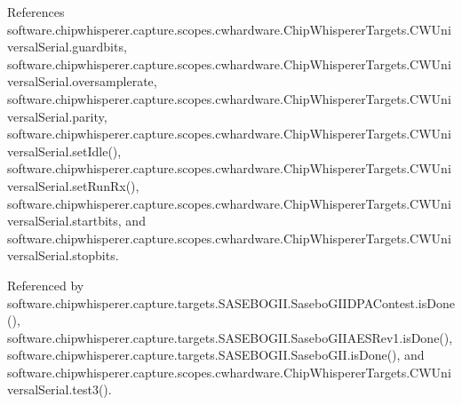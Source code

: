 References software.\+chipwhisperer.\+capture.\+scopes.\+cwhardware.\+Chip\+Whisperer\+Targets.\+C\+W\+Universal\+Serial.\+guardbits, software.\+chipwhisperer.\+capture.\+scopes.\+cwhardware.\+Chip\+Whisperer\+Targets.\+C\+W\+Universal\+Serial.\+oversamplerate, software.\+chipwhisperer.\+capture.\+scopes.\+cwhardware.\+Chip\+Whisperer\+Targets.\+C\+W\+Universal\+Serial.\+parity, software.\+chipwhisperer.\+capture.\+scopes.\+cwhardware.\+Chip\+Whisperer\+Targets.\+C\+W\+Universal\+Serial.\+set\+Idle(), software.\+chipwhisperer.\+capture.\+scopes.\+cwhardware.\+Chip\+Whisperer\+Targets.\+C\+W\+Universal\+Serial.\+set\+Run\+Rx(), software.\+chipwhisperer.\+capture.\+scopes.\+cwhardware.\+Chip\+Whisperer\+Targets.\+C\+W\+Universal\+Serial.\+startbits, and software.\+chipwhisperer.\+capture.\+scopes.\+cwhardware.\+Chip\+Whisperer\+Targets.\+C\+W\+Universal\+Serial.\+stopbits.



Referenced by software.\+chipwhisperer.\+capture.\+targets.\+S\+A\+S\+E\+B\+O\+G\+I\+I.\+Sasebo\+G\+I\+I\+D\+P\+A\+Contest.\+is\+Done(), software.\+chipwhisperer.\+capture.\+targets.\+S\+A\+S\+E\+B\+O\+G\+I\+I.\+Sasebo\+G\+I\+I\+A\+E\+S\+Rev1.\+is\+Done(), software.\+chipwhisperer.\+capture.\+targets.\+S\+A\+S\+E\+B\+O\+G\+I\+I.\+Sasebo\+G\+I\+I.\+is\+Done(), and software.\+chipwhisperer.\+capture.\+scopes.\+cwhardware.\+Chip\+Whisperer\+Targets.\+C\+W\+Universal\+Serial.\+test3().


